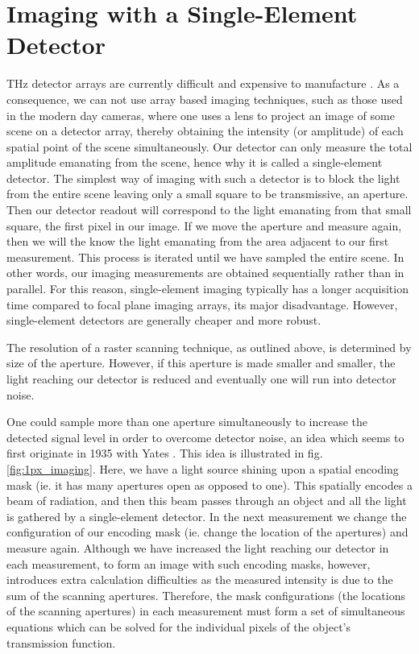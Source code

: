 \section{Imaging with a Single-Element Detector}\label{sec:single_pixel_imaging}
THz detector arrays are currently difficult and expensive to manufacture \cite{T-ray_sensing}. As a consequence, we can not use array based imaging techniques, such as those used in the modern day cameras, where one uses a lens to project an image of some scene on a detector array, thereby obtaining the intensity (or amplitude) of each spatial point of the scene simultaneously. Our detector can only measure the total amplitude emanating from the scene, hence why it is called a single-element detector. The simplest way of imaging with such a detector is to block the light from the entire scene leaving only a small square to be transmissive, an aperture. Then our detector readout will correspond to the light emanating from that small square, the first pixel in our image. If we move the aperture and measure again, then we will the know the light emanating from the area adjacent to our first measurement. This process is iterated until we have sampled the entire scene. In other words, our imaging measurements are obtained sequentially rather than in parallel. For this reason, single-element imaging typically has a longer acquisition time compared to focal plane imaging arrays, its major disadvantage. However, single-element detectors are generally cheaper and more robust.

The resolution of a raster scanning technique, as outlined above, is determined by size of the aperture. However, if this aperture is made smaller and smaller, the light reaching our detector is reduced and eventually one will run into detector noise. 

One could sample more than one aperture simultaneously to increase the detected signal level in order to overcome detector noise, an idea which seems to first originate in 1935 with Yates \cite{Yates}. This idea is illustrated in fig. \ref{fig:1px_imaging}. Here, we have a light source shining upon a spatial encoding mask (ie. it has many apertures open as opposed to one). This spatially encodes a beam of radiation, and then this beam passes through an object and all the light is gathered by a single-element detector. In the next measurement we change the configuration of our encoding mask (ie. change the location of the apertures) and measure again. Although we have increased the light reaching our detector in each measurement, to form an image with such encoding masks, however, introduces extra calculation difficulties as the measured intensity is due to the sum of the scanning apertures. Therefore, the mask configurations (the locations of the scanning apertures) in each measurement must form a set of simultaneous equations which can be solved for the individual pixels of the object’s transmission function.

